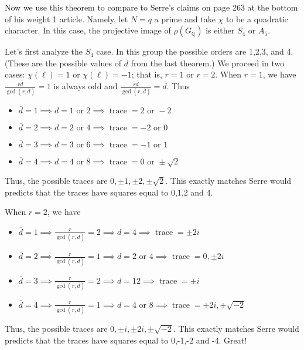 \documentclass[11pt]{amsart}
\theoremstyle{plain}
\theoremstyle{definition}
\newcommand{\Q}{{\mathbb Q}}
\DeclareMathOperator{\tr}{trace}
\renewcommand{\[}{\left[}
\renewcommand{\]}{\right]}
\newcommand{\dbar}{\overline{d}}
\begin{document}
Now we use this theorem to compare to Serre's claims on page 263 at the bottom of his weight 1 article.  Namely, let $N = q$ a prime and take $\chi$ to be a quadratic character.  In this case, the projective image of $\rho(G_\Q)$ is either $S_4$ or $A_5$.  

Let's first analyze the $S_4$ case.  In this group the possible orders are 1,2,3, and 4.  (These are the possible values of $\dbar$ from the last theorem.)  We proceed in two cases: $\chi(\ell) = 1$ or $\chi(\ell) = -1$; that is, $r=1$ or $r=2$. When $r = 1$, we have $\frac{r \dbar}{\gcd(r,\dbar)} = 1$ is always odd and $\frac{r \dbar}{\gcd(r,\dbar)} = \dbar$.  Thus 
\begin{itemize}
\item $\dbar = 1 \implies d = 1 \text{~or~} 2 \implies \tr = 2 \text{~or~} -2$
\item $\dbar = 2 \implies d = 2 \text{~or~} 4 \implies \tr = -2 \text{~or~} 0$
\item $\dbar = 3 \implies d = 3 \text{~or~} 6 \implies \tr = -1 \text{~or~} 1$
\item $\dbar = 4 \implies d = 4 \text{~or~} 8 \implies \tr = 0 \text{~or~}\pm \sqrt{2}$
\end{itemize}
Thus, the possible traces are $0, \pm 1, \pm 2, \pm \sqrt{2}$.  This exactly matches Serre would predicts that the traces have squares equal to 0,1,2 and 4.

When $r = 2$, we have
\begin{itemize}
\item $\dbar = 1 \implies \frac{r}{\gcd(r,\dbar)} = 2 \implies d = 4 \implies \tr = \pm 2i$
\item $\dbar = 2 \implies \frac{r}{\gcd(r,\dbar)} = 1 \implies d = 2 \text{~or~} 4 \implies \tr = 0, \pm 2i$
\item $\dbar = 3 \implies \frac{r}{\gcd(r,\dbar)} = 2 \implies d = 12 \implies \tr = \pm i$
\item $\dbar = 4 \implies \frac{r}{\gcd(r,\dbar)} = 1 \implies d = 4 \text{~or~} 8 \implies \tr = \pm 2i , \pm \sqrt{-2}$
\end{itemize}
Thus, the possible traces are $0, \pm i, \pm 2i, \pm \sqrt{-2}$.  This exactly matches Serre would predicts that the traces have squares equal to 0,-1,-2 and -4.  Great!
\end{document}
